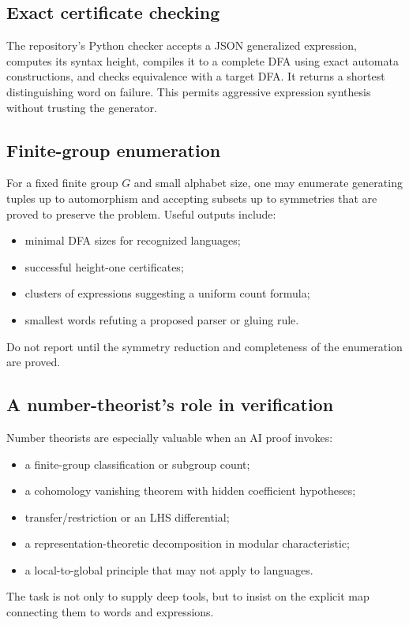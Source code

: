 \documentclass{amsart}
\begin{document}
\subsection{Exact certificate checking}

The repository's Python checker accepts a JSON generalized expression, computes its syntax height, compiles it to a complete DFA using exact automata constructions, and checks equivalence with a target DFA.  It returns a shortest distinguishing word on failure.  This permits aggressive expression synthesis without trusting the generator.

\subsection{Finite-group enumeration}

For a fixed finite group $G$ and small alphabet size, one may enumerate generating tuples up to automorphism and accepting subsets up to symmetries that are proved to preserve the problem.  Useful outputs include:
\begin{itemize}
  \item minimal DFA sizes for recognized languages;
  \item successful height-one certificates;
  \item clusters of expressions suggesting a uniform count formula;
  \item smallest words refuting a proposed parser or gluing rule.
\end{itemize}
Do not report  until the symmetry reduction and completeness of the enumeration are proved.

\subsection{A number-theorist's role in verification}

Number theorists are especially valuable when an AI proof invokes:
\begin{itemize}
  \item a finite-group classification or subgroup count;
  \item a cohomology vanishing theorem with hidden coefficient hypotheses;
  \item transfer/restriction or an LHS differential;
  \item a representation-theoretic decomposition in modular characteristic;
  \item a local-to-global principle that may not apply to languages.
\end{itemize}
The task is not only to supply deep tools, but to insist on the explicit map connecting them to words and expressions.
\end{document}
